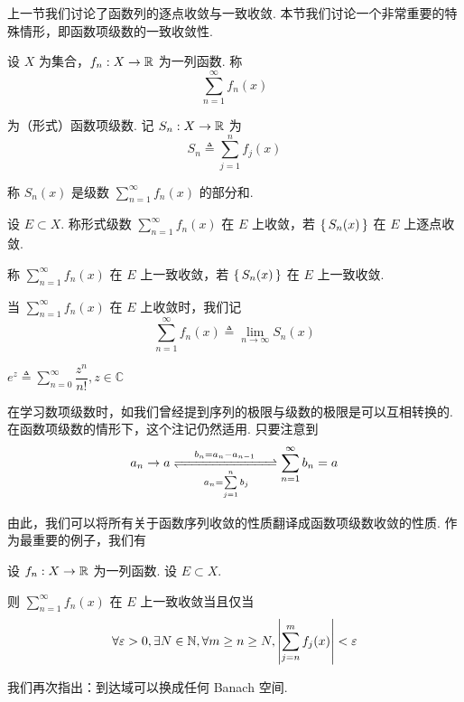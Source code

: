 上一节我们讨论了函数列的逐点收敛与一致收敛. 本节我们讨论一个非常重要的特殊情形，即函数项级数的一致收敛性.


\begin{definition}
    设 $X$ 为集合，$f_n:X\to\mathbb{R}$ 为一列函数. 称
$$
\sum_{n=1}^\infty f_n(x)
$$

    为（形式）函数项级数. 记 $S_n:X\to\mathbb{R}$ 为
$$
S_n\triangleq\sum_{j=1}^nf_j(x)
$$

    称 $S_n(x)$ 是级数 $\sum\limits_{n=1}^\infty f_n(x)$ 的部分和.
\end{definition}

\begin{definition}
    设 $E\subset X$. 称形式级数 $\sum\limits_{n=1}^\infty f_n(x)$ 在 $E$ 上收敛，若 $\set{S_n(x)}$ 在 $E$ 上逐点收敛.

    称 $\sum\limits_{n=1}^\infty f_n(x)$ 在 $E$ 上一致收敛，若 $\set{S_n(x)}$ 在 $E$ 上一致收敛.

    当 $\sum\limits_{n=1}^\infty f_n(x)$ 在 $E$ 上收敛时，我们记
$$
\sum_{n=1}^\infty f_n(x)\triangleq\lim_{n\to\infty}S_n(x)
$$
\end{definition}

\begin{example}
    $e^z\triangleq\sum\limits_{n=0}^\infty\dfrac{z^n}{n!},z\in\mathbb{C}$
\end{example}

\begin{hint}
    在学习数项级数时，如我们曾经提到序列的极限与级数的极限是可以互相转换的. 在函数项级数的情形下，这个注记仍然适用. 只要注意到
$$
a_n\to a\xrightleftharpoons[\qquad a_n=\sum\limits_{j=1}^nb_j\qquad]{b_n=a_n-a_{n-1}}\sum_{n=1}^\infty b_n=a
$$

    由此，我们可以将所有关于函数序列收敛的性质翻译成函数项级数收敛的性质. 作为最重要的例子，我们有
\end{hint}

\begin{property}[Cauchy]
    设 $f_n:X\to\mathbb{R}$ 为一列函数. 设 $E\subset X$.

    则 $\sum\limits_{n=1}^\infty f_n(x)$ 在 $E$ 上一致收敛当且仅当
$$
\forall\varepsilon>0,\exists N\in\mathbb{N},\forall m\ge n\ge N,\left\lvert{\sum_{j=n}^mf_j(x)}\right\rvert<\varepsilon
$$
\end{property}

\begin{hint}
    我们再次指出：到达域可以换成任何 Banach 空间.
\end{hint}

